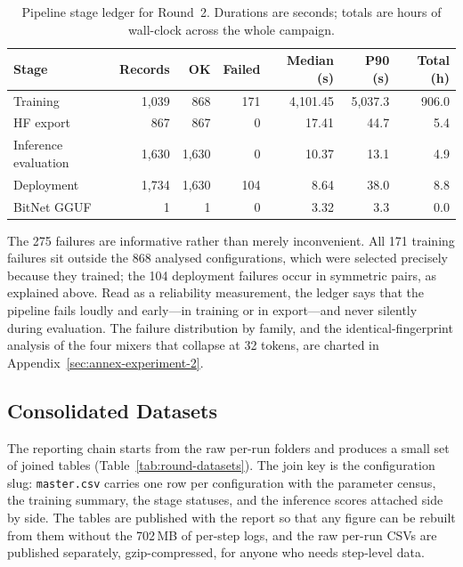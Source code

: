 \begin{table}[H]
\centering
\small
\caption{Pipeline stage ledger for Round~2. Durations are seconds; totals are hours of wall-clock across the whole campaign.}
\label{tab:stage-ledger}
\begin{tabular}{lrrrrrr}
\toprule
Stage & Records & OK & Failed & Median (s) & P90 (s) & Total (h) \\
\midrule
Training              & 1{,}039 & 868  & 171 & 4{,}101.45 & 5{,}037.3 & 906.0 \\
HF export             & 867     & 867  & 0   & 17.41      & 44.7      & 5.4   \\
Inference evaluation  & 1{,}630 & 1{,}630 & 0 & 10.37      & 13.1      & 4.9   \\
Deployment            & 1{,}734 & 1{,}630 & 104 & 8.64     & 38.0      & 8.8   \\
BitNet GGUF           & 1       & 1    & 0   & 3.32       & 3.3       & 0.0   \\
\bottomrule
\end{tabular}
\end{table}

The 275 failures are informative rather than merely inconvenient. All 171 training failures sit outside the 868 analysed configurations, which were selected precisely because they trained; the 104 deployment failures occur in symmetric pairs, as explained above. Read as a reliability measurement, the ledger says that the pipeline fails loudly and early---in training or in export---and never silently during evaluation. The failure distribution by family, and the identical-fingerprint analysis of the four mixers that collapse at 32 tokens, are charted in Appendix~\ref{sec:annex-experiment-2}.

\subsection{Consolidated Datasets}

The reporting chain starts from the raw per-run folders and produces a small set of joined tables (Table~\ref{tab:round-datasets}). The join key is the configuration slug: \texttt{master.csv} carries one row per configuration with the parameter census, the training summary, the stage statuses, and the inference scores attached side by side. The tables are published with the report so that any figure can be rebuilt from them without the 702\,MB of per-step logs, and the raw per-run CSVs are published separately, gzip-compressed, for anyone who needs step-level data.

